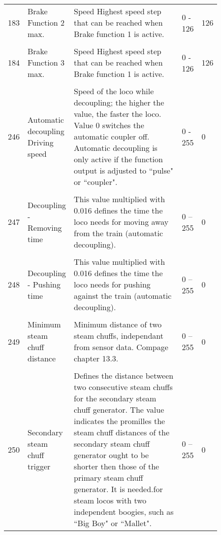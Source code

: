 \begin{tabular}{p{0.075\linewidth} p{0.15\linewidth} p{0.525\linewidth} p{0.06\linewidth} p{0.05\linewidth}}
183 & Brake Function 2 max. & Speed Highest speed step that can be reached when Brake function 1 is active. & 0 - 126 & 126\\
\\
184 & Brake Function 3 max. & Speed Highest speed step that can be reached when Brake function 1 is active. & 0 - 126 & 126\\
\\
246 & Automatic decoupling Driving speed & Speed of the loco while decoupling; the higher the value, the faster the loco. Value 0 switches the automatic coupler off. Automatic decoupling is only active if the function output is adjusted to ``pulse" or ``coupler". & 0 - 255 & 0\\
\\
247 & Decoupling - Removing time & This value multiplied with 0.016 defines the time the loco needs for moving away from the train (automatic decoupling). & 0 – 255 & 0\\
\\
248 & Decoupling - Pushing time & This value multiplied with 0.016 defines the time the loco needs for pushing against the train (automatic decoupling). & 0 – 255 & 0\\
\\
249 & Minimum steam chuff distance & Minimum distance of two steam chuffs, independant from sensor data. Compage chapter 13.3. & 0 – 255 & 0\\
\\
250 & Secondary steam chuff trigger & Defines the distance between two consecutive steam chuffs for the secondary steam chuff generator. The value indicates the promilles the steam chuff distances of the secondary steam chuff generator ought to be shorter then those of the primary steam chuff generator. It is needed.for steam locos with two independent boogies, such as ``Big Boy" or ``Mallet". & 0 – 255 & 0\\
\end{tabular}
\newpage
